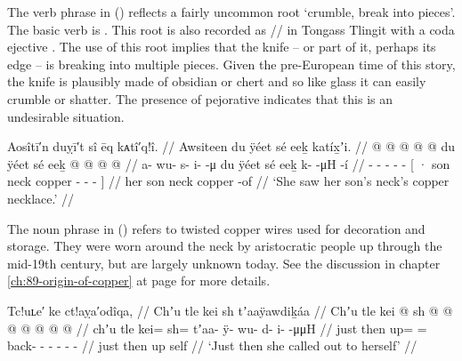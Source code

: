 The verb phrase  in (\lastx) reflects a fairly uncommon root  ‘crumble, break into pieces’.
The basic verb is .
This root is also recorded as  // in Tongass Tlingit with a coda ejective \parencite[f01/163]{leer:1973}.
The use of this root implies that the knife – or part of it, perhaps its edge – is breaking into multiple pieces.
Given the pre-European time of this story, the knife is plausibly made of obsidian or chert and so like glass it can easily crumble or shatter.
The presence of pejorative  indicates that this is an undesirable situation.

\ex\label{ex:100-132-see-copper-necklace}%
%
\begingl
	\glpreamble	Aosîtī′n duỵī′t sî ēq kᴀtî′q!î. //
	\glpreamble	Awsiteen du ÿéet sé eeḵ katíx̱ʼi. //
	\gla	{} @ {} @ {} @ {} @ {} @ {}
		{} du ÿéet sé eeḵ  @ {} @ {} @ {} @ {} {} //
	\glb	a- wu- s- i-  -μ 
		{} du ÿéet sé eeḵ k-  -μH -í {} //
	\glc	{}- - - -  -
		{}[ · son neck copper -  - - {}] //
	\gld	{} {} {} {} {} {}
		{} her son neck copper  {} {} -of {} //
	\glft	‘She saw her son’s neck’s copper necklace.’
		//
\endgl
\xe

The noun phrase  in (\lastx) refers to twisted copper wires used for decoration and storage.
They were worn around the neck by aristocratic people up through the mid-19th century, but are largely unknown today.
See the discussion in chapter \ref{ch:89-origin-of-copper} at page \pageref{note:89-153-twist-of-copper} for more details.


\ex\label{ex:100-133-call-out-to-self}%
%
\begingl
	\glpreamble	Tc!uʟe′ ke ct!aỵa′odîqa, //
	\glpreamble	Chʼu tle kei sh tʼaaÿawdiḵáa //
	\gla	Chʼu tle kei @ sh @  @ {} @ {} @ {} @ {} @ {} @ {} //
	\glb	chʼu tle kei= sh= tʼaa- ÿ- wu- d- i-  -μμH //
	\glc	just then up= = back- - - - -  - //
	\gld	just then up self  {} {} {} {} {} {} //
	\glft	‘Just then she called out to herself’
		//
\endgl
\xe

